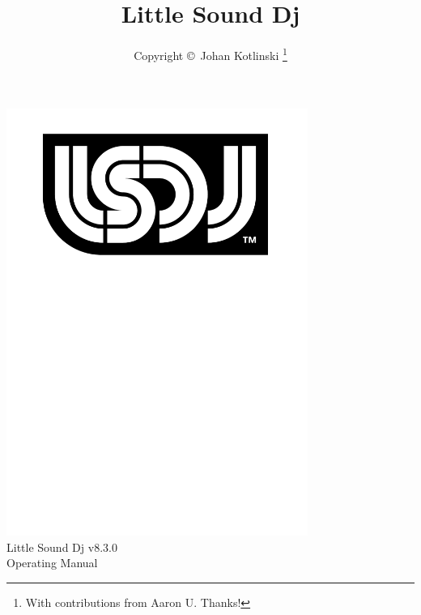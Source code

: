 \documentclass[a4paper,12pt,titlepage]{book}
\author{Copyright \copyright~Johan Kotlinski \thanks{With contributions from Aaron U. Thanks!}}
\title{Little Sound Dj \lsdjversion{}}
\newcommand{\lsdjversion}{v8.3.0}
\begin{document}
\begin{titlepage}
\begin{center}
\vspace*{2.75cm}
\includegraphics[width=9.85cm]{lsdj_black_rgb}\\
\vspace*{1.00cm}
\normalfont\sffamily
\LARGE
Little Sound Dj \lsdjversion{}
\\
\vspace*{0.65cm}
Operating Manual
\end{center}
\end{titlepage}

\maketitle
\tableofcontents








\appendix

\end{document}

